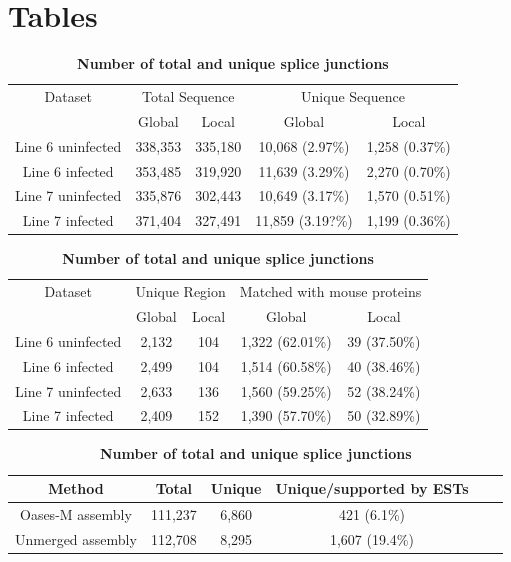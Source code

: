 \documentclass[10pt]{article}
\begin{document}
\section*{Tables}
\begin{table}[!ht]
\caption{
\bf{Unique sequences from global and local assembly}}
\begin{tabular}{ccccc}
\hline
Dataset & \multicolumn{2}{c}{Total Sequence} & \multicolumn{2}{c}{Unique Sequence}\\
 & Global & Local & Global & Local\\
\hline
Line 6 uninfected & 338,353 & 335,180 & 10,068 (2.97\%) & 1,258 (0.37\%)\\
Line 6 infected & 353,485 & 319,920 & 11,639 (3.29\%)& 2,270 (0.70\%)\\
Line 7 uninfected & 335,876 & 302,443 & 10,649 (3.17\%) & 1,570 (0.51\%)\\
Line 7 infected & 371,404 & 327,491 & 11,859 (3.19?\%)& 1,199 (0.36\%)\\
\hline
\end{tabular}
\label{unique_sequences}

\caption{
\bf{Unique regions from global and local assembly}}
\begin{tabular}{ccccc}
\hline
Dataset & \multicolumn{2}{c}{Unique Region} & \multicolumn{2}{c}{Matched with mouse proteins}\\
 & Global & Local & Global & Local\\
\hline
Line 6 uninfected & 2,132 & 104 & 1,322 (62.01\%) & 39 (37.50\%)\\
Line 6 infected & 2,499 & 104 & 1,514 (60.58\%)& 40 (38.46\%)\\
Line 7 uninfected & 2,633 & 136 & 1,560 (59.25\%) & 52 (38.24\%)\\
Line 7 infected & 2,409 & 152 & 1,390 (57.70\%)& 50 (32.89\%)\\
\hline
\end{tabular}
\label{unique_sequences_matched_mouse}

\caption{
\bf{Number of total and unique splice junctions}}
\begin{tabular}{cccccc}
\hline
Method& Total & Unique & Unique/supported by ESTs \\ 
\hline
Oases-M assembly & 111,237 & 6,860 & 421 (6.1\%) \\
Unmerged assembly & 112,708 & 8,295 & 1,607 (19.4\%) \\
\hline
\end{tabular}
\label{Oases-M}


\end{table}
\end{document}
